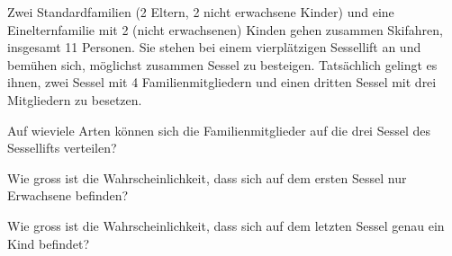 Zwei Standardfamilien (2 Eltern, 2 nicht erwachsene Kinder) und eine
Einelternfamilie mit 2 (nicht erwachsenen) Kinden gehen zusammen Skifahren,
insgesamt 11 Personen.
Sie stehen bei einem vierplätzigen Sessellift an und bemühen sich,
möglichst zusammen Sessel zu besteigen. Tatsächlich gelingt es
ihnen, zwei Sessel mit 4 Familienmitgliedern und einen dritten
Sessel mit drei Mitgliedern zu besetzen.
\begin{teilaufgaben}
\item Auf wieviele Arten können sich die Familienmitglieder auf
die drei Sessel des Sessellifts verteilen?
\item
Wie gross ist die Wahrscheinlichkeit, dass sich auf dem ersten
Sessel nur Erwachsene befinden?
\item
Wie gross ist die Wahrscheinlichkeit, dass sich auf dem letzten Sessel
genau ein Kind befindet?
\end{teilaufgaben}


